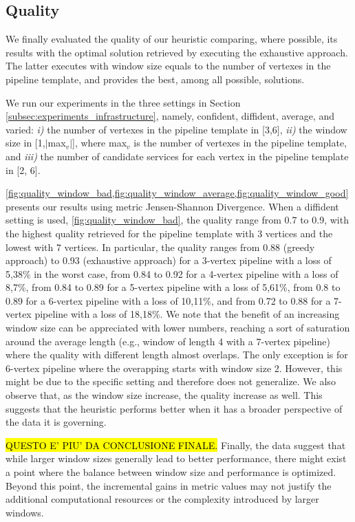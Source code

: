 \subsection{Quality}\label{subsec:experiments_quality}
We finally evaluated the quality of our heuristic comparing, where possible, its results with the optimal solution retrieved by executing the exhaustive approach. The latter executes with window size equals to the number of vertexes in the pipeline template, and provides the best, among all possible, solutions.

We run our experiments in the three settings in Section \cref{subsec:experiments_infrastructure}, namely, confident, diffident, average, and varied: \emph{i)} the number of vertexes in the pipeline template in [3,6], \emph{ii)} the window size in [1,$|$max$_v$$|$], where max$_v$ is the number of vertexes in the pipeline template, and \emph{iii)} the number of candidate services for each vertex in the pipeline template in [2, 6].

\cref{fig:quality_window_bad,fig:quality_window_average,fig:quality_window_good} presents our results using metric Jensen-Shannon Divergence.
%
When a diffident setting is used, \cref{fig:quality_window_bad}, the quality range from 0.7 to 0.9, with the highest quality retrieved for the pipeline template with 3 vertices and the lowest with 7 vertices.
In particular, the quality ranges from 0.88 (greedy approach) to 0.93 (exhaustive approach) for a 3-vertex pipeline with a loss of 5,38\% in the worst case, from 0.84 to 0.92 for a 4-vertex pipeline with a loss of 8,7\%, from 0.84 to 0.89 for a 5-vertex pipeline with a loss of 5,61\%, from 0.8 to 0.89 for a 6-vertex pipeline with a loss of 10,11\%, and from 0.72 to 0.88 for a 7-vertex pipeline with a loss of 18,18\%. We note that the benefit of an increasing window size can be appreciated with lower numbers, reaching a sort of saturation around the average length (e.g., window of length 4 with a 7-vertex pipeline) where the quality with different length almost overlaps. The only exception is for 6-vertex pipeline where the overapping starts with window size 2. However, this might be due to the specific setting and therefore does not generalize.
We also observe that, as the window size increase, the quality increase as well. This suggests that the heuristic performs better when it has a broader perspective of the data it is governing.

\hl{QUESTO E' PIU' DA CONCLUSIONE FINALE.} Finally, the data suggest that while larger window sizes generally lead to better performance, there might exist a point where the balance between window size and performance is optimized. Beyond this point, the incremental gains in metric values may not justify the additional computational resources or the complexity introduced by larger windows.


